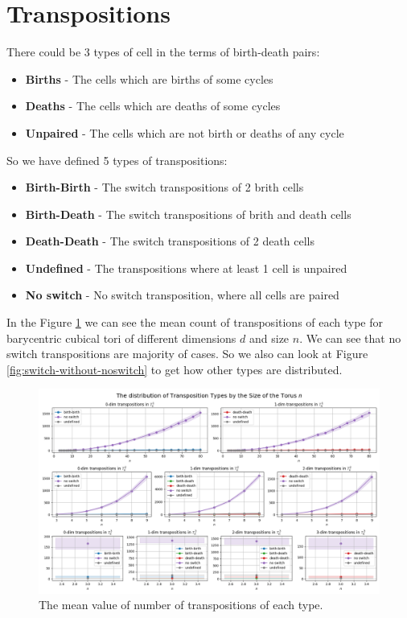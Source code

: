 \documentclass{article}
\begin{document}
\section{Transpositions}
\par There could be 3 types of cell in the terms of birth-death pairs:
\begin{itemize}
    \item \textbf{Births} - The cells which are births of some cycles
    \item \textbf{Deaths} - The cells which are deaths of some cycles
    \item \textbf{Unpaired} - The cells which are not birth or deaths of any cycle
\end{itemize}

\par So we have defined 5 types of transpositions:
\begin{itemize}
    \item \textbf{Birth-Birth} - The switch transpositions of 2 brith cells
    \item \textbf{Birth-Death} - The switch transpositions of brith and death cells
    \item \textbf{Death-Death} - The switch transpositions of 2 death cells
    \item \textbf{Undefined} - The transpositions where at least 1 cell is unpaired
    \item \textbf{No switch} - No switch transposition, where all cells are paired
\end{itemize}

\par In the Figure \ref{fig:switch-full} we can see the mean count of transpositions of each type for barycentric cubical tori of different dimensions $d$ and size $n$.
We can see that no switch transpositions are majority of cases. So we also can look at Figure \ref{fig:switch-without-noswitch} to get how other types are distributed.

\begin{figure}[h!]
    \centering
    \includegraphics[width=1.3\textwidth]{pics/torus-transpositions/switch-types.png}
    \caption{The mean value of number of transpositions of each type.}
    \label{fig:switch-full}
\end{figure}
\end{document}
